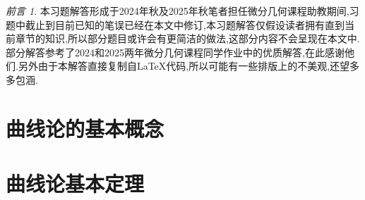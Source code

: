 \newtheorem{excise}{练习}

\renewcommand*{\Re}{\operatorname{Re}}
\renewcommand*{\Im}{\operatorname{Im}}
\newcommand{\T}{\mathrm{T}}
\newcommand{\rank}{\operatorname{rank}}
\newcommand{\diag}{\operatorname{diag}}
\newcommand{\tr}{\operatorname{tr}}
\newcommand{\sgn}{\operatorname{sgn}}

\newcommand{\widebar}{\bar}

\newcommand{\d}{\mathrm{d}}
\newcommand{\C}{\mathbb{C}} 
\newcommand{\Q}{\mathbb{Q}} 
\newcommand{\D}{\mathbb{D}}

\newcommand{\df}[2]{\dfrac{\d #1}{\d #2}}
\newcommand{\pf}[2]{\dfrac{\partial #1}{\partial #2}}

\newtheorem*{thm*}{定理}

\newcommand{\pll}{\kern 0.56em/\kern -0.8em /\kern 0.56em}

\theoremstyle{remark}\newtheorem*{remark*}{前言}
\begin{remark*}
本习题解答形成于2024年秋及2025年秋笔者担任微分几何课程助教期间,习题中截止到目前已知的笔误已经在本文中修订,本习题解答仅假设读者拥有直到当前章节的知识,所以部分题目或许会有更简洁的做法,这部分内容不会呈现在本文中.部分解答参考了2024和2025两年微分几何课程同学作业中的优质解答,在此感谢他们.另外由于本解答直接复制自LaTeX代码,所以可能有一些排版上的不美观,还望多多包涵.
\end{remark*}
\section{曲线论的基本概念}

\section{曲线论基本定理}

